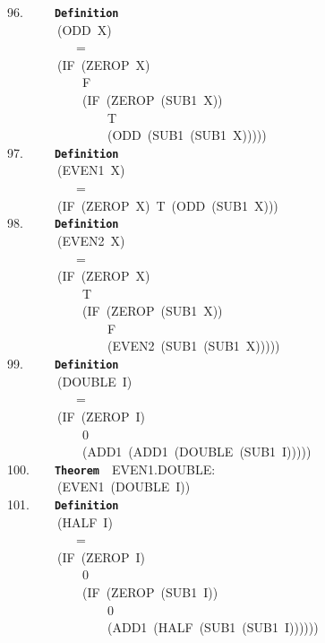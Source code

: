 \documentclass[11pt]{book}
\newenvironment{pubasis}{\begin{flushleft}\ttfamily\small}{\normalsize\rmfamily\end{flushleft}}
\newcommand{\axiomordefinition}[1]{\vspace{6pt}\texttt{\textbf{#1}}}
\begin{document}
\begin{pubasis}
96.~~~~~\axiomordefinition{Definition}\\
~~~~~~~~(ODD~X)\\
~~~~~~~~~~~=\\
~~~~~~~~(IF~(ZEROP~X)\\
~~~~~~~~~~~~F\\
~~~~~~~~~~~~(IF~(ZEROP~(SUB1~X))\\
~~~~~~~~~~~~~~~~T\\
~~~~~~~~~~~~~~~~(ODD~(SUB1~(SUB1~X)))))\\

97.~~~~~\axiomordefinition{Definition}\\
~~~~~~~~(EVEN1~X)\\
~~~~~~~~~~~=\\
~~~~~~~~(IF~(ZEROP~X)~T~(ODD~(SUB1~X)))\\

98.~~~~~\axiomordefinition{Definition}\\
~~~~~~~~(EVEN2~X)\\
~~~~~~~~~~~=\\
~~~~~~~~(IF~(ZEROP~X)\\
~~~~~~~~~~~~T\\
~~~~~~~~~~~~(IF~(ZEROP~(SUB1~X))\\
~~~~~~~~~~~~~~~~F\\
~~~~~~~~~~~~~~~~(EVEN2~(SUB1~(SUB1~X)))))\\

99.~~~~~\axiomordefinition{Definition}\\
~~~~~~~~(DOUBLE~I)\\
~~~~~~~~~~~=\\
~~~~~~~~(IF~(ZEROP~I)\\
~~~~~~~~~~~~0\\
~~~~~~~~~~~~(ADD1~(ADD1~(DOUBLE~(SUB1~I)))))\\

100.~~~~\axiomordefinition{Theorem}~~EVEN1.DOUBLE:\\
~~~~~~~~(EVEN1~(DOUBLE~I))\\

101.~~~~\axiomordefinition{Definition}\\
~~~~~~~~(HALF~I)\\
~~~~~~~~~~~=\\
~~~~~~~~(IF~(ZEROP~I)\\
~~~~~~~~~~~~0\\
~~~~~~~~~~~~(IF~(ZEROP~(SUB1~I))\\
~~~~~~~~~~~~~~~~0\\
~~~~~~~~~~~~~~~~(ADD1~(HALF~(SUB1~(SUB1~I))))))\\


\end{pubasis}
\end{document}
